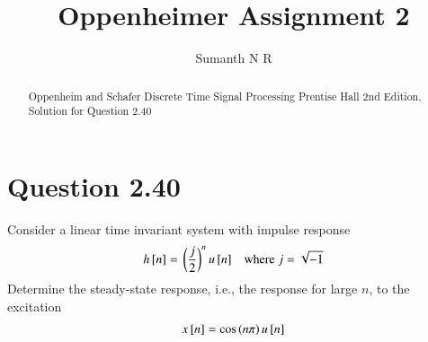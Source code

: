 \documentclass[journal,12pt,twocolumn]{IEEEtran}
\begin{document}
\let\StandardTheFigure\thefigure
\renewcommand{\thefigure}{\theproblem}

\def\putbox#1#2#3{\makebox[0in][l]{\makebox[#1][l]{}\raisebox{\baselineskip}[0in][0in]{\raisebox{#2}[0in][0in]{#3}}}}
\def\rightbox#1{\makebox[0in][r]{#1}}
\def\centbox#1{\makebox[0in]{#1}}
\def\topbox#1{\raisebox{-\baselineskip}[0in][0in]{#1}}
\def\midbox#1{\raisebox{-0.5\baselineskip}[0in][0in]{#1}}

\vspace{3cm}

\title{ Oppenheimer Assignment 2 }
\author{ Sumanth N R }
\maketitle
\tableofcontents

\renewcommand{\thefigure}{\theenumi}
\renewcommand{\thetable}{\theenumi}

\bigskip

\begin{abstract}
	Oppenheim and Schafer Discrete Time Signal 
	Processing Prentise Hall 2nd Edition,
	Solution for Question 2.40
\end{abstract}



\section{Question 2.40}
\noindent Consider a linear time invariant system with impulse response
\begin{align}
	h{}\left[n\right] =& \ \left(\frac{j}{2}\right)^n u{}\left[n\right]
		& \text{where } j = \sqrt{-1}
	\label{eq:q-h-n}
\end{align}
Determine the steady-state response, i.e., the response for large $n$,
to the excitation
\begin{align}
	x{}\left[n\right] = \cos\left(n\pi\right) u{}\left[n\right]
	\label{eq:q-x-n}
\end{align}
\bigskip
\end{document}
